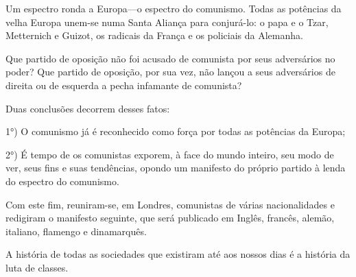\alinhaversocentro{}

\alinhanormal


Um espectro ronda a Europa---o espectro do comunismo. Todas as
potências da velha Europa unem-se numa Santa Aliança para conjurá-lo:
o papa e o Tzar, Metternich e Guizot, os radicais da França e os
policiais da Alemanha.

Que partido de oposição não foi acusado de comunista por seus
adversários no poder? Que partido de oposição, por sua vez, não lançou
a seus adversários de direita ou de esquerda a pecha infamante de
comunista?

Duas conclusões decorrem desses fatos:

1°) O comunismo já é reconhecido como força por todas as potências da
Europa;

2°) É tempo de os comunistas exporem, à face do mundo inteiro, seu
modo de ver, seus fins e suas tendências, opondo um manifesto do
próprio partido à lenda do
espectro do comunismo.

Com este fim, reuniram-se, em Londres, comunistas de várias
nacionalidades e redigiram o manifesto seguinte, que será publicado em
Inglês, francês, alemão, italiano, flamengo e dinamarquês.




A história de todas as sociedades que existiram até aos nossos
dias é a história da luta de classes.


